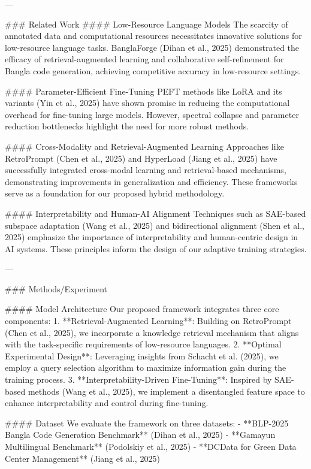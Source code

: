 ---

### Related Work
#### Low-Resource Language Models
The scarcity of annotated data and computational resources necessitates innovative solutions for low-resource language tasks. BanglaForge (Dihan et al., 2025) demonstrated the efficacy of retrieval-augmented learning and collaborative self-refinement for Bangla code generation, achieving competitive accuracy in low-resource settings.

#### Parameter-Efficient Fine-Tuning
PEFT methods like LoRA and its variants (Yin et al., 2025) have shown promise in reducing the computational overhead for fine-tuning large models. However, spectral collapse and parameter reduction bottlenecks highlight the need for more robust methods.

#### Cross-Modality and Retrieval-Augmented Learning
Approaches like RetroPrompt (Chen et al., 2025) and HyperLoad (Jiang et al., 2025) have successfully integrated cross-modal learning and retrieval-based mechanisms, demonstrating improvements in generalization and efficiency. These frameworks serve as a foundation for our proposed hybrid methodology.

#### Interpretability and Human-AI Alignment
Techniques such as SAE-based subspace adaptation (Wang et al., 2025) and bidirectional alignment (Shen et al., 2025) emphasize the importance of interpretability and human-centric design in AI systems. These principles inform the design of our adaptive training strategies.

---

### Methods/Experiment

#### Model Architecture
Our proposed framework integrates three core components:
1. **Retrieval-Augmented Learning**: Building on RetroPrompt (Chen et al., 2025), we incorporate a knowledge retrieval mechanism that aligns with the task-specific requirements of low-resource languages.
2. **Optimal Experimental Design**: Leveraging insights from Schacht et al. (2025), we employ a query selection algorithm to maximize information gain during the training process.
3. **Interpretability-Driven Fine-Tuning**: Inspired by SAE-based methods (Wang et al., 2025), we implement a disentangled feature space to enhance interpretability and control during fine-tuning.

#### Dataset
We evaluate the framework on three datasets:
- **BLP-2025 Bangla Code Generation Benchmark** (Dihan et al., 2025)
- **Gamayun Multilingual Benchmark** (Podolskiy et al., 2025)
- **DCData for Green Data Center Management** (Jiang et al., 2025)

